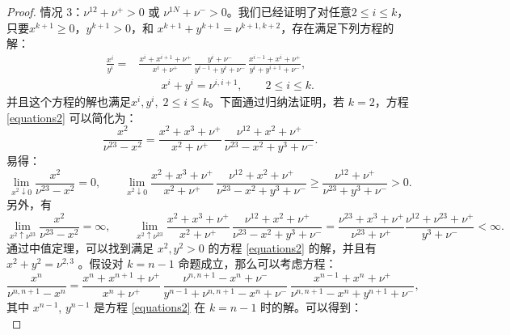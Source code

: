 \begin{proof}
    情况 3：$\nu^{12}+\nu^{+}>0$ 或 $\nu^{1N}+\nu^{-}>0$。我们已经证明了对任意$2\le i\le k$，只要$x^{k+1}\ge 0$，$y^{k+1}>0$，和 $x^{k+1}+y^{k+1}=\nu^{k+1,k+2}$，存在满足下列方程的解：
    \begin{equation}\label{equations2}
        \begin{split}
            \frac{x^{i}}{y^{i}}
            =&\frac{x^{i}+x^{i+1}+\nu^+}{x^{i}+\nu^+}\, \frac{y^{i}+\nu^-}{y^{i-1}+y^{i}+\nu^-}
            \,\frac{x^{i-1}+x^{i}+\nu^+}{y^{i}+y^{i+1}+\nu^-},\\
            &\qquad x^{i} + y^{i} = \nu^{i,i+1},\qquad 2\le i\le k.
        \end{split}
    \end{equation}
    并且这个方程的解也满足$x^i,y^i,\; 2 \le i\le k$。下面通过归纳法证明，若 $k=2$，方程 \eqref{equations2} 可以简化为：
    \begin{equation*}\label{equation k=2}
        \frac{x^{2}}{\nu^{23}-x^2}
        =\frac{x^{2}+x^{3}+\nu^+}{x^{2}+\nu^+}\, \frac{\nu^{12}+x^{2}+\nu^{+}}{\nu^{23}-x^2+y^3+\nu^-}.
    \end{equation*}
    易得：
    \begin{equation*}
        \lim_{x^{2}\downarrow 0}\frac{x^{2}}{\nu^{23}-x^2} = 0,\qquad \lim_{x^{2}\downarrow 0}\frac{x^{2}+x^{3}+\nu^+}{x^{2}+\nu^+}\,  \frac{\nu^{12}+x^{2}+\nu^{+}}{\nu^{23}-x^2+y^3+\nu^-} \ge  \frac{\nu^{12}+\nu^{+}}{\nu^{23}+y^{3}+\nu^-} > 0.
    \end{equation*} 
    另外，有
    \begin{equation*}
        \lim_{x^2\uparrow \nu^{23}}\frac{x^{2}}{\nu^{23}-x^2} = \infty,\qquad \lim_{x^{2}\uparrow \nu^{23}}\frac{x^{2}+x^{3}+\nu^+}{x^{2}+\nu^+}\, \frac{\nu^{12}+x^{2}+\nu^{+}}{\nu^{23}-x^2+y^3+\nu^-} =  \frac{\nu^{23}+x^{3}+\nu^+}{\nu^{23}+\nu^+}\frac{\nu^{12}+\nu^{23}+\nu^{+}}{y^{3}+\nu^-} < \infty.
    \end{equation*}
    通过中值定理，可以找到满足 $x^{2},y^2>0$ 的方程 \eqref{equations2} 的解，并且有 $x^{2}+y^{2}=\nu^{2,3}$ 。假设对 $k=n-1$ 命题成立，那么可以考虑方程：
    \begin{equation*}
        \frac{x^{n}}{\nu^{n,n+1}-x^{n}} = \frac{x^{n}+x^{n+1}+\nu^+}{x^{n}+\nu^+}\,\frac{\nu^{n,n+1}-x^{n}+\nu^-}{y^{n-1}+\nu^{n,n+1}-x^{n}+\nu^-}\,\frac{x^{n-1}+x^{n}+\nu^+}{\nu^{n,n+1}-x^{n}+y^{n+1}+\nu^-},
    \end{equation*}
    其中 $x^{n-1}$, $y^{n-1}$ 是方程 \eqref{equations2} 在 $k=n-1$ 时的解。可以得到：
    \begin{equation}\label{limit1}

\end{equation}
\end{proof}
